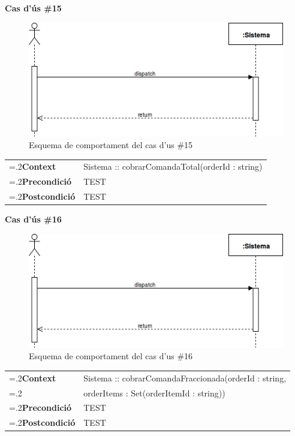\clearpage
\noindent\textbf{\large Cas d'ús \#15}\\
\begin{figure}[H]
\centering
\includegraphics[scale=0.6]{Figures/casdus_00.png}
\caption{Esquema de comportament del cas d'us \#15}
\end{figure}
\begin{table}[h]
\noindent
\begin{tabularx}{\linewidth}{
>{\hsize=.2\hsize}X%
>{\hsize=0.8\hsize}X%
}
\textbf{Context} 		& Sistema :: cobrarComandaTotal(orderId : string) \\
\textbf{Precondició} 	& TEST \\
\textbf{Postcondició}	& TEST \\
\end{tabularx}
\label{}
\end{table}

\noindent\textbf{\large Cas d'ús \#16}\\
\begin{figure}[H]
\centering
\includegraphics[scale=0.6]{Figures/casdus_00.png}
\caption{Esquema de comportament del cas d'us \#16}
\end{figure}
\begin{table}[h]
\noindent
\begin{tabularx}{\linewidth}{
>{\hsize=.2\hsize}X%
>{\hsize=0.8\hsize}X%
}
\textbf{Context} 		& Sistema :: cobrarComandaFraccionada(orderId : string,\\
						& orderItems : Set(orderItemId : string)) \\
\textbf{Precondició} 	& TEST \\
\textbf{Postcondició}	& TEST \\
\end{tabularx}
\label{}
\end{table}

